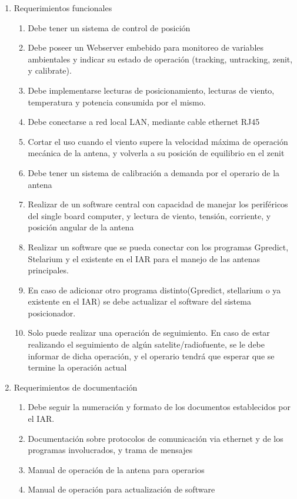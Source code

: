 \documentclass[11pt, %
codirector, %
]{charter}
\begin{document}
\begin{enumerate}
	\item Requerimientos funcionales
		\begin{enumerate}
			\item Debe tener un sistema de control de posición
			\item Debe poseer un Webserver embebido para monitoreo de variables ambientales y indicar su estado de operación (tracking, untracking, zenit, y calibrate). 
			\item Debe implementarse lecturas de posicionamiento, lecturas de viento, temperatura y potencia consumida por el mismo. 
			\item Debe conectarse a red local LAN, mediante cable ethernet RJ45 
			\item  Cortar el uso cuando el viento supere la velocidad máxima de operación mecánica de la antena, y volverla a su posición de equilibrio en el zenit 
			\item Debe tener un sistema de calibración a demanda por el operario de la antena 
			\item Realizar de un software central con capacidad de manejar los periféricos del single board computer, y lectura de viento, tensión, corriente, y posición angular de la antena
			\item Realizar un software que se pueda conectar con los programas Gpredict, Stelarium y el existente en el IAR para el manejo de las antenas principales. 
			\item En caso de adicionar otro programa distinto(Gpredict, stellarium o ya existente en el IAR) se debe actualizar el software del sistema posicionador. 
			\item Solo puede realizar una operación de seguimiento. En caso de estar realizando el seguimiento de algún satelite/radiofuente, se le debe informar de dicha operación, y el operario tendrá que esperar que se termine la operación actual  
		\end{enumerate}
	\item Requerimientos de documentación
		\begin{enumerate}
			\item Debe seguir la numeración y formato de los documentos establecidos por el IAR. 
			\item Documentación sobre protocolos de comunicación via ethernet y de los programas involucrados, y trama de mensajes 
			\item Manual de operación de la antena para operarios 
			\item Manual de operación para actualización de software 

\end{enumerate}
\end{enumerate}
\end{document}
